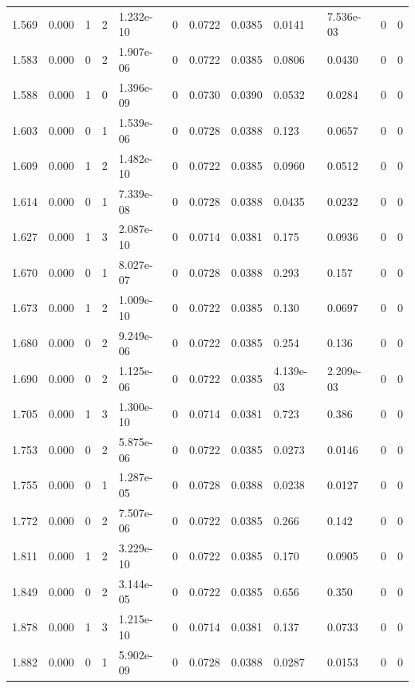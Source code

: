 \documentclass[preview]{standalone}
\begin{document}
{{{\begin{tabular}{L{1.2cm}C{1.2cm} C{0.3cm}C{0.5cm} C{1.4cm}C{1.4cm} C{1.4cm}C{1.4cm} C{1.6cm}C{1.6cm} C{1.6cm}C{1.6cm}}
  1.569  &  0.000  & 1     &  2 &  1.232e-10  & 0  &  0.0722&   0.0385& 0.0141 & 7.536e-03   &  0 & 0  \\ 
  1.583  &  0.000  & 0     &  2 &  1.907e-06  & 0  &  0.0722&   0.0385& 0.0806 & 0.0430   &  0 & 0  \\ 
  1.588  &  0.000  & 1     &  0 &  1.396e-09  & 0  &  0.0730&   0.0390& 0.0532 & 0.0284   &  0 & 0  \\ 
  1.603  &  0.000  & 0     &  1 &  1.539e-06  & 0  &  0.0728&   0.0388& 0.123 & 0.0657   &  0 & 0  \\ 
  1.609  &  0.000  & 1     &  2 &  1.482e-10  & 0  &  0.0722&   0.0385& 0.0960 & 0.0512   &  0 & 0  \\ 
  1.614  &  0.000  & 0     &  1 &  7.339e-08  & 0  &  0.0728&   0.0388& 0.0435 & 0.0232   &  0 & 0  \\ 
  1.627  &  0.000  & 1     &  3 &  2.087e-10  & 0  &  0.0714&   0.0381& 0.175 & 0.0936   &  0 & 0  \\ 
  1.670  &  0.000  & 0     &  1 &  8.027e-07  & 0  &  0.0728&   0.0388& 0.293 & 0.157   &  0 & 0  \\ 
  1.673  &  0.000  & 1     &  2 &  1.009e-10  & 0  &  0.0722&   0.0385& 0.130 & 0.0697   &  0 & 0  \\ 
  1.680  &  0.000  & 0     &  2 &  9.249e-06  & 0  &  0.0722&   0.0385& 0.254 & 0.136   &  0 & 0  \\ 
  1.690  &  0.000  & 0     &  2 &  1.125e-06  & 0  &  0.0722&   0.0385& 4.139e-03 & 2.209e-03   &  0 & 0  \\ 
  1.705  &  0.000  & 1     &  3 &  1.300e-10  & 0  &  0.0714&   0.0381& 0.723 & 0.386   &  0 & 0  \\ 
  1.753  &  0.000  & 0     &  2 &  5.875e-06  & 0  &  0.0722&   0.0385& 0.0273 & 0.0146   &  0 & 0  \\ 
  1.755  &  0.000  & 0     &  1 &  1.287e-05  & 0  &  0.0728&   0.0388& 0.0238 & 0.0127   &  0 & 0  \\ 
  1.772  &  0.000  & 0     &  2 &  7.507e-06  & 0  &  0.0722&   0.0385& 0.266 & 0.142   &  0 & 0  \\ 
  1.811  &  0.000  & 1     &  2 &  3.229e-10  & 0  &  0.0722&   0.0385& 0.170 & 0.0905   &  0 & 0  \\ 
  1.849  &  0.000  & 0     &  2 &  3.144e-05  & 0  &  0.0722&   0.0385& 0.656 & 0.350   &  0 & 0  \\ 
  1.878  &  0.000  & 1     &  3 &  1.215e-10  & 0  &  0.0714&   0.0381& 0.137 & 0.0733   &  0 & 0  \\ 
  1.882  &  0.000  & 0     &  1 &  5.902e-09  & 0  &  0.0728&   0.0388& 0.0287 & 0.0153   &  0 & 0  \\ 

\end{tabular}}}}
\end{document}
